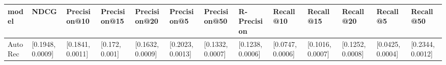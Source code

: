 \begin{tabular}{lllllllllllll}
\toprule
   model &              NDCG &      Precision@10 &    Precision@15 &      Precision@20 &       Precision@5 &      Precision@50 &       R-Precision &         Recall@10 &         Recall@15 &         Recall@20 &          Recall@5 &         Recall@50 \\
\midrule
 AutoRec &  [0.1948, 0.0009] &  [0.1841, 0.0011] &  [0.172, 0.001] &  [0.1632, 0.0009] &  [0.2023, 0.0013] &  [0.1332, 0.0007] &  [0.1238, 0.0006] &  [0.0747, 0.0006] &  [0.1016, 0.0007] &  [0.1252, 0.0008] &  [0.0425, 0.0004] &  [0.2344, 0.0012] \\
\bottomrule
\end{tabular}
